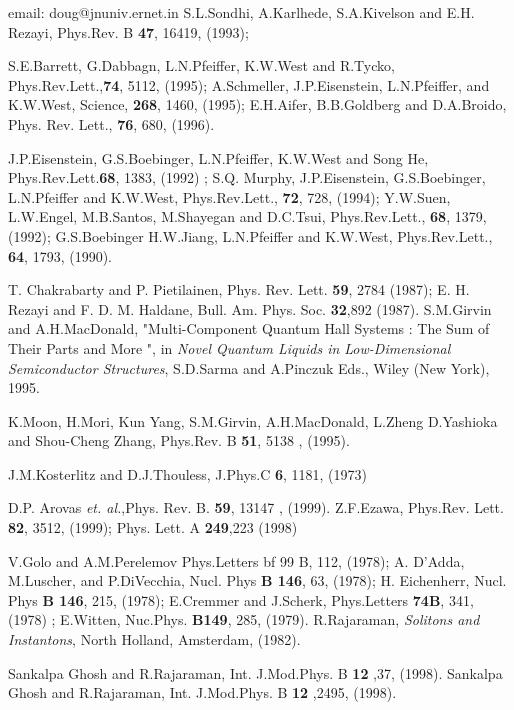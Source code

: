 \begin{references}

 email: doug@jnuniv.ernet.in
 S.L.Sondhi, A.Karlhede, S.A.Kivelson and E.H. Rezayi,
Phys.Rev. B {\bf 47}, 16419, (1993);

 S.E.Barrett, G.Dabbagn, L.N.Pfeiffer, K.W.West 
and R.Tycko, Phys.Rev.Lett.,{\bf 74}, 5112, (1995); A.Schmeller, 
J.P.Eisenstein, L.N.Pfeiffer, and K.W.West, Science, {\bf 268}, 
1460, (1995); E.H.Aifer, B.B.Goldberg and D.A.Broido, Phys. Rev. 
Lett., {\bf 76}, 680, (1996).

 J.P.Eisenstein, G.S.Boebinger, L.N.Pfeiffer,
K.W.West and Song He, Phys.Rev.Lett.{\bf 68}, 1383, (1992) ; S.Q.
Murphy, J.P.Eisenstein, G.S.Boebinger, L.N.Pfeiffer and
K.W.West, Phys.Rev.Lett., {\bf 72}, 728, (1994); Y.W.Suen,
L.W.Engel, M.B.Santos, M.Shayegan and D.C.Tsui, Phys.Rev.Lett.,
{\bf 68}, 1379, (1992); G.S.Boebinger H.W.Jiang, L.N.Pfeiffer
and K.W.West, Phys.Rev.Lett., {\bf 64}, 1793, (1990).

 T. Chakrabarty and P. Pietilainen, Phys. Rev. Lett. {\bf 59},
2784 (1987); E. H. Rezayi and F. D. M. Haldane, Bull. Am. Phys. Soc. {\bf
32},892 (1987).
 S.M.Girvin and A.H.MacDonald, "Multi-Component Quantum Hall
Systems : The Sum of Their Parts and More ", in {\it Novel Quantum 
Liquids in Low-Dimensional Semiconductor Structures}, S.D.Sarma and A.Pinczuk
Eds., Wiley (New York), 1995.

 K.Moon, H.Mori, Kun Yang, S.M.Girvin, A.H.MacDonald, L.Zheng
D.Yashioka and Shou-Cheng Zhang, Phys.Rev. B {\bf 51}, 5138 , (1995).

 J.M.Kosterlitz and D.J.Thouless, J.Phys.C {\bf 6}, 1181, (1973)

 D.P. Arovas {\sl et. al.},Phys. Rev. B. {\bf 59},
13147 , (1999).
 Z.F.Ezawa, Phys.Rev. Lett. {\bf 82}, 3512, (1999); 
Phys. Lett. A {\bf 249},223 (1998)

 V.Golo and A.M.Perelemov Phys.Letters {bf 99 B}, 112, (1978);
A. D'Adda, M.Luscher, and P.DiVecchia, Nucl. Phys {\bf B 146}, 63, (1978);
H. Eichenherr, Nucl. Phys {\bf B 146}, 215, (1978); E.Cremmer and
J.Scherk, Phys.Letters {\bf 74B}, 341, (1978) ; E.Witten, Nuc.Phys.
{\bf B149}, 285, (1979).
 R.Rajaraman, {\it Solitons and Instantons}, North Holland, 
Amsterdam, (1982).

 Sankalpa Ghosh and R.Rajaraman, Int. J.Mod.Phys. B
{\bf 12} ,37, (1998).
 Sankalpa Ghosh and R.Rajaraman, Int. J.Mod.Phys. B
{\bf 12} ,2495, (1998).


\end{references}
